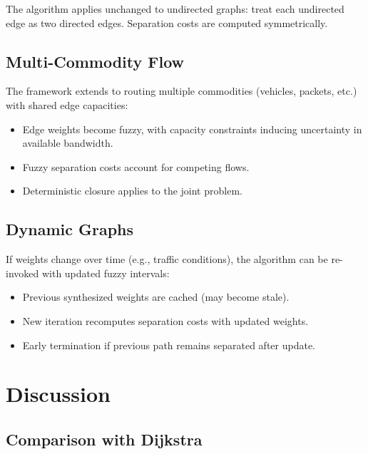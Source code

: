 \documentclass[twocolumn,11pt,a4paper]{article}
\theoremstyle{definition}
\begin{document}
The algorithm applies unchanged to undirected graphs: treat each undirected edge as two directed edges. Separation costs are computed symmetrically.

\subsection{Multi-Commodity Flow}

The framework extends to routing multiple commodities (vehicles, packets, etc.) with shared edge capacities:
\begin{itemize}
\item Edge weights become fuzzy, with capacity constraints inducing uncertainty in available bandwidth.
\item Fuzzy separation costs account for competing flows.
\item Deterministic closure applies to the joint problem.
\end{itemize}

\subsection{Dynamic Graphs}

If weights change over time (e.g., traffic conditions), the algorithm can be re-invoked with updated fuzzy intervals:
\begin{itemize}
\item Previous synthesized weights are cached (may become stale).
\item New iteration recomputes separation costs with updated weights.
\item Early termination if previous path remains separated after update.
\end{itemize}

\section{Discussion}

\subsection{Comparison with Dijkstra}
\end{document}

